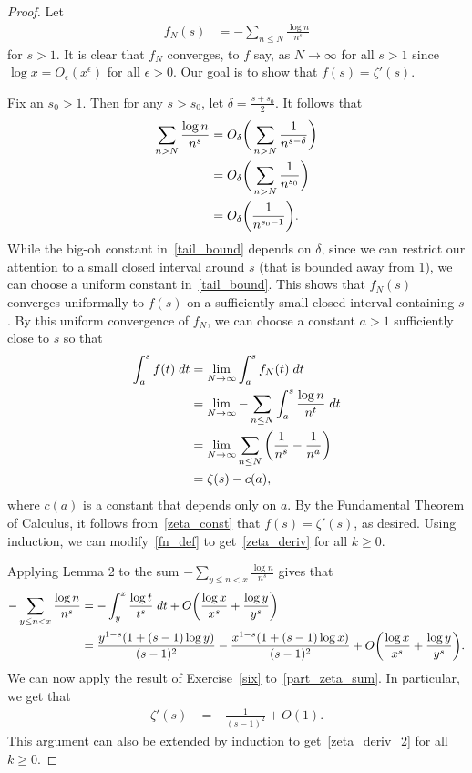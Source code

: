 \documentclass[11pt]{article}
\begin{document}
\begin{proof}
Let
\begin{align}
f_N(s) &= -\sum_{n\leq N}\frac{\log{n}}{n^s}\label{fn_def}
\end{align}
for $s>1$. It is clear that $f_N$ converges, to $f$ say, as $N\to\infty$ for all $s>1$ since $\log{x}=O_\epsilon(x^\epsilon)$ for all $\epsilon>0$. Our goal is to show that $f(s) = \zeta'(s)$.

Fix an $s_0>1$. Then for any $s> s_0$, let $\delta=\frac{s+s_0}{2}$. It follows that
\begin{align}
\sum_{n>N}\frac{\log{n}}{n^s} &= O_\delta\bigg(\sum_{n>N}\frac{1}{n^{s-\delta}}\bigg)\notag\\
&= O_\delta\bigg(\sum_{n>N}\frac{1}{n^{s_0}}\bigg)\notag\\
&= O_\delta\bigg(\frac{1}{n^{s_0-1}}\bigg).\label{tail_bound}
\end{align}
While the big-oh constant in~\eqref{tail_bound} depends on $\delta$, since we can restrict our attention to a small closed interval around $s$ (that is bounded away from 1), we can choose a uniform constant in~\eqref{tail_bound}. This shows that $f_N(s)$ converges uniformally to $f(s)$ on a sufficiently small closed interval containing $s$. By this uniform convergence of $f_N$, we can choose a constant $a>1$ sufficiently close to $s$ so that
\begin{align}
\int_a^s f(t)\;dt &= \lim_{N\to\infty} \int_a^s f_N(t)\;dt\notag\\
&= \lim_{N\to\infty}-\sum_{n\leq N}\int_a^s \frac{\log{n}}{n^t}\;dt\notag\\
&= \lim_{N\to\infty} \sum_{n\leq N}\bigg(\frac{1}{n^s}-\frac{1}{n^a}\bigg)\notag\\
&= \zeta(s)-c(a),\label{zeta_const}
\end{align}
where $c(a)$ is a constant that depends only on $a$. By the Fundamental Theorem of Calculus, it follows from~\eqref{zeta_const} that $f(s)=\zeta'(s)$, as desired. Using induction, we can modify~\eqref{fn_def} to get~\eqref{zeta_deriv} for all $k\geq 0$.

Applying Lemma 2 to the sum $-\sum_{y\leq n<x}\frac{\log{n}}{n^s}$ gives that
\begin{align}
-\sum_{y\leq n<x}\frac{\log{n}}{n^s} &= -\int_y^x\frac{\log{t}}{t^s}\;dt + O\bigg(\frac{\log{x}}{x^s}+\frac{\log{y}}{y^s}\bigg)\notag\\
&= \frac{y^{1-s}(1+(s-1)\log{y})}{(s-1)^2} - \frac{x^{1-s}(1+(s-1)\log{x})}{(s-1)^2} + O\bigg(\frac{\log{x}}{x^s}+\frac{\log{y}}{y^s}\bigg).\label{part_zeta_sum}
\end{align}
We can now apply the result of Exercise~\ref{six} to~\eqref{part_zeta_sum}. In particular, we get that
\begin{align*}
\zeta'(s) &= -\frac{1}{(s-1)^2}+O(1).
\end{align*}
This argument can also be extended by induction to get~\eqref{zeta_deriv_2} for all $k\geq 0$.
\end{proof}
\end{document}
